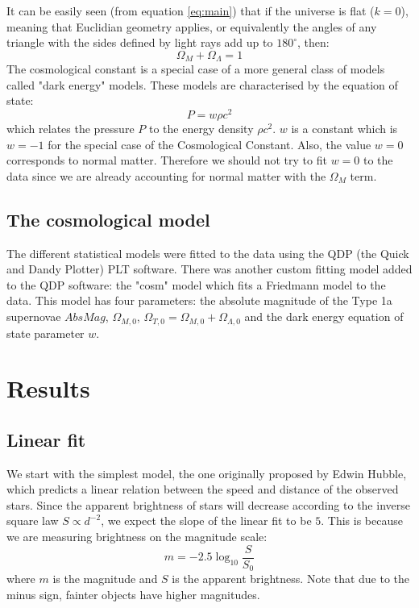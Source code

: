 \documentclass[11pt]{article}
\begin{document}
It can be easily seen (from equation \eqref{eq:main}) that if the universe is flat ($k = 0$), meaning that Euclidian geometry applies, or equivalently the angles of any triangle with the sides defined by light rays add up to $180^\circ$, then: 
\begin{equation}
	\Omega_M + \Omega_\Lambda = 1
	\label{eq:flat}
\end{equation}
The cosmological constant is a special case of a more general class of models called "dark energy" models. These models are characterised by the equation of state:
\begin{equation}
	P = w \rho c^2
	\label{eq:dark}
\end{equation}
which relates the pressure $P$ to the energy density $\rho c^2$. $w$ is a constant which is $w = -1$ for the special case of the Cosmological Constant. Also, the value $w = 0$ corresponds to normal matter. Therefore we should not try to fit $w = 0$ to the data since we are already accounting for normal matter with the $\Omega_M$ term. 

\subsection{The cosmological model}
The different statistical models were fitted to the data using the QDP (the Quick and Dandy Plotter) PLT software. There was another custom fitting model added to the QDP software: the "cosm" model which fits a Friedmann model to the data. This model has four parameters: the absolute magnitude of the Type 1a supernovae $AbsMag$, $\Omega_{M,0}$, $\Omega_{T,0} = \Omega_{M,0} + \Omega_{\Lambda,0}$ and the dark energy equation of state parameter $w$.

\section{Results}
\subsection{Linear fit} \label{sec:linear}
We start with the simplest model, the one originally proposed by Edwin Hubble, which predicts a linear relation between the speed and distance of the observed stars. Since the apparent brightness of stars will decrease according to the inverse square law $S \propto d^{-2}$, we expect the slope of the linear fit to be $5$. This is because we are measuring brightness on the magnitude scale:
\begin{equation}
	m = -2.5\log_{10}\frac{S}{S_0}
	\label{eq:mag}
\end{equation}
where $m$ is the magnitude and  $S$ is the apparent brightness. Note that due to the minus sign, fainter objects have higher magnitudes. 
\end{document}
